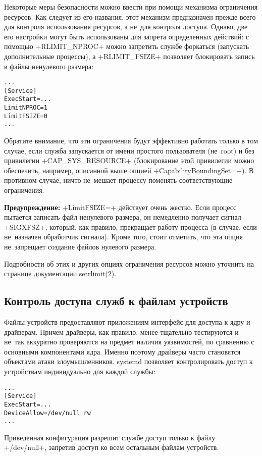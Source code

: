 \documentclass[10pt,oneside,a4paper]{article}
\newenvironment{caveat}[1][]{\smallskip\par\textbf{Предупреждение#1: }}%
	{\smallskip\par}
\begin{document}
Некоторые меры безопасности можно ввести при помощи механизма ограничения
ресурсов. Как следует из его названия, этот механизм предназначен прежде всего
для контроля использования ресурсов, а не~для контроля доступа. Однако, две его
настройки могут быть использованы для запрета определенных действий:
с помощью +RLIMIT_NPROC+ можно запретить службе форкаться (запускать
дополнительные процессы), а +RLIMIT_FSIZE+ позволяет блокировать запись в файлы
ненулевого размера:
\begin{Verbatim}
...
[Service]
ExecStart=...
LimitNPROC=1
LimitFSIZE=0
...
\end{Verbatim}
Обратите внимание, что эти ограничения будут эффективно работать только в том
случае, если служба запускается от имени простого пользователя (не~root) и
без привилегии +CAP_SYS_RESOURCE+ (блокирование этой привилегии можно
обеспечить, например, описанной выше опцией +CapabilityBoundingSet=+). В
противном случае, ничто не~мешает процессу поменять соответствующие ограничения.

\begin{caveat}
+LimitFSIZE=+ действует очень жестко. Если процесс пытается записать файл
ненулевого размера, он немедленно получает сигнал +SIGXFSZ+, который, как
правило, прекращает работу процесса (в случае, если не~назначен обработчик
сигнала). Кроме того, стоит отметить, что эта опция не~запрещает создание файлов
нулевого размера.
\end{caveat}

Подробности об этих и других опциях ограничения ресурсов можно уточнить на
странице документации \href{http://linux.die.net/man/2/setrlimit}{setrlimit(2)}.

\subsection{Контроль доступа служб к файлам устройств}

Файлы устройств предоставляют приложениям интерфейс для доступа к ядру и
драйверам. Причем драйверы, как правило, менее тщательно тестируются и не~так
аккуратно проверяются на предмет наличия уязвимостей, по сравнению с основными
компонентами ядра. Именно поэтому драйверы часто становятся объектами атаки
злоумышленников. systemd позволяет контролировать доступ к устройствам
индивидуально для каждой службы:
\begin{Verbatim}
...
[Service]
ExecStart=...
DeviceAllow=/dev/null rw
...
\end{Verbatim}
Приведенная конфигурация разрешит службе доступ только к файлу +/dev/null+,
запретив доступ ко всем остальным файлам устройств.
\end{document}
